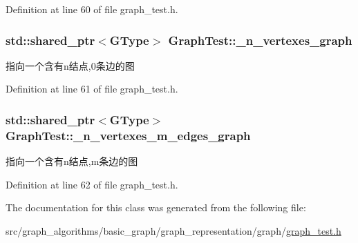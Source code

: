 Definition at line 60 of file graph\+\_\+test.\+h.

\hypertarget{class_graph_test_a2dac828599509e577b5406d06f613a16}{}
\subsubsection[{\+\_\+n\+\_\+vertexes\+\_\+graph}]{\setlength{\rightskip}{0pt plus 5cm}std\+::shared\+\_\+ptr$<${\bf G\+Type}$>$ Graph\+Test\+::\+\_\+n\+\_\+vertexes\+\_\+graph\hspace{0.3cm}{\ttfamily [protected]}}\label{class_graph_test_a2dac828599509e577b5406d06f613a16}
指向一个含有n结点,0条边的图 

Definition at line 61 of file graph\+\_\+test.\+h.

\hypertarget{class_graph_test_aaa662e57a6eb46a91c59464871b4907f}{}
\subsubsection[{\+\_\+n\+\_\+vertexes\+\_\+m\+\_\+edges\+\_\+graph}]{\setlength{\rightskip}{0pt plus 5cm}std\+::shared\+\_\+ptr$<${\bf G\+Type}$>$ Graph\+Test\+::\+\_\+n\+\_\+vertexes\+\_\+m\+\_\+edges\+\_\+graph\hspace{0.3cm}{\ttfamily [protected]}}\label{class_graph_test_aaa662e57a6eb46a91c59464871b4907f}
指向一个含有n结点,m条边的图 

Definition at line 62 of file graph\+\_\+test.\+h.



The documentation for this class was generated from the following file\+:\begin{DoxyCompactItemize}
\item 
src/graph\+\_\+algorithms/basic\+\_\+graph/graph\+\_\+representation/graph/\hyperlink{graph__test_8h}{graph\+\_\+test.\+h}\end{DoxyCompactItemize}
